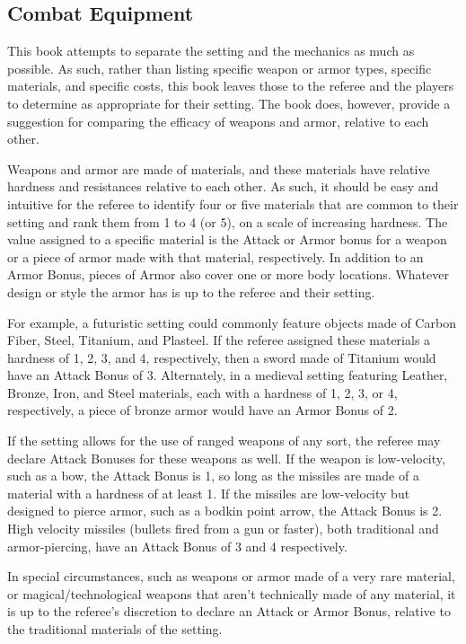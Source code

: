 \documentclass[oneside]{book}
\begin{document}
\begin{multicols}{2}
\section{Combat Equipment}
This book attempts to separate the setting and the mechanics as much as possible. As such, rather than listing specific weapon or armor types, specific materials, and specific costs, this book leaves those to the referee and the players to determine as appropriate for their setting. The book does, however, provide a suggestion for comparing the efficacy of weapons and armor, relative to each other. 

Weapons and armor are made of materials, and these materials have relative hardness and resistances relative to each other. As such, it should be easy and intuitive for the referee to identify four or five materials that are common to their setting and rank them from 1 to 4 (or 5), on a scale of increasing hardness. The value assigned to a specific material is the Attack or Armor bonus for a weapon or a piece of armor made with that material, respectively. In addition to an Armor Bonus, pieces of Armor also cover one or more body locations. Whatever design or style the armor has is up to the referee and their setting. 

For example, a futuristic setting could commonly feature objects made of Carbon Fiber, Steel, Titanium, and Plasteel. If the referee assigned these materials a hardness of 1, 2, 3, and 4, respectively, then a sword made of Titanium would have an Attack Bonus of 3. Alternately, in a medieval setting featuring Leather, Bronze, Iron, and Steel materials, each with a hardness of 1, 2, 3, or 4, respectively, a piece of bronze armor would have an Armor Bonus of 2. 

If the setting allows for the use of ranged weapons of any sort, the referee may declare Attack Bonuses for these weapons as well. If the weapon is low-velocity, such as a bow, the Attack Bonus is 1, so long as the missiles are made of a material with a hardness of at least 1. If the missiles are low-velocity but designed to pierce armor, such as a bodkin point arrow, the Attack Bonus is 2. High velocity missiles (bullets fired from a gun or faster), both traditional and armor-piercing, have an Attack Bonus of 3 and 4 respectively. 

In special circumstances, such as weapons or armor made of a very rare material, or magical/technological weapons that aren't technically made of any material, it is up to the referee's discretion to declare an Attack or Armor Bonus, relative to the traditional materials of the setting. 


\end{multicols}
\end{document}
